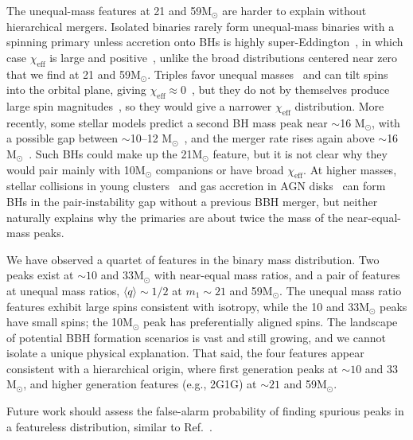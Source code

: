 \documentclass[%
    aps,
    prl,
    reprint,
    superscriptaddress,
    nolongbibliography,
    nobibnotes,
    nofootinbib,
    linenumbers,
    amsmath,amssymb,
]{revtex4-2}
\newcommand{\Msun}{\ensuremath{\mathrm{M}_{\odot}}}
\newcommand{\chieff}{\ensuremath{\chi_{\mathrm{eff}}}}
\newcommand{\twoGoneG}{\ac{2G1G}\xspace}
\newcommand{\featTen}{10\xspace}
\newcommand{\featTwenty}{21\xspace}
\newcommand{\featThirtyFive}{33\xspace}
\newcommand{\featSixty}{59\xspace}
\begin{document}
The unequal-mass features at \featTwenty and \featSixty $\Msun$ are harder to explain without hierarchical mergers. Isolated binaries rarely form unequal-mass binaries with a spinning primary unless accretion onto \acp{BH} is highly super-Eddington~\cite{Zevin:2022wrw}, in which case $\chieff$ is large and positive~\cite{Briel:2026qas}, unlike the broad distributions centered near zero that we find at \featTwenty and \featSixty $\Msun$. Triples favor unequal masses~\cite{Su:2021ogc, Martinez:2021tmr} and can tilt spins into the orbital plane, giving $\chieff \approx 0$~\cite{Antonini:2017tgo, Liu:2019gdc}, but they do not by themselves produce large spin magnitudes~\cite{LIGOScientific:2025brd}, so they would give a narrower $\chieff$ distribution. More recently, some stellar models predict a second \ac{BH} mass peak near $\sim$16 $\Msun$, with a possible gap between $\sim$10--12 $\Msun$~\cite{Woosley:2019nnp, Schneider:2023mxe}, and the merger rate rises again above $\sim$16 $\Msun$~\cite{Legred:2026oiz}. Such \acp{BH} could make up the \featTwenty $\Msun$ feature, but it is not clear why they would pair mainly with \featTen $\Msun$ companions or have broad $\chieff$. At higher masses, stellar collisions in young clusters~\cite{DiCarlo:2019fcq, Kremer:2020wtp} and gas accretion in \ac{AGN} disks~\cite{Tagawa:2020qll} can form \acp{BH} in the pair-instability gap without a previous \ac{BBH} merger, but neither naturally explains why the primaries are about twice the mass of the near-equal-mass peaks.

We have observed a quartet of features in the binary mass distribution. Two peaks exist at $\sim \featTen$ and \featThirtyFive $\Msun$ with near-equal mass ratios, and a pair of features at unequal mass ratios, $\langle q\rangle \sim 1/2$ at $m_1\sim \featTwenty$ and \featSixty $\Msun$. The unequal mass ratio features exhibit large spins consistent with isotropy, while the \featTen and \featThirtyFive $\Msun$ peaks have small spins; the \featTen $\Msun$ peak has preferentially aligned spins. The landscape of potential \ac{BBH} formation scenarios is vast and still growing, and we cannot isolate a unique physical explanation. That said, the four features appear consistent with a hierarchical origin, where first generation peaks at $\sim \featTen$ and $\featThirtyFive$ $\Msun$, and higher generation features (e.g., \twoGoneG) at $\sim \featTwenty$ and \featSixty $\Msun$. 

Future work should assess the false-alarm probability of finding spurious peaks in a featureless distribution, similar to Ref.~\cite{Farah:2023vsc, Mould:2026sww}. 
\end{document}

